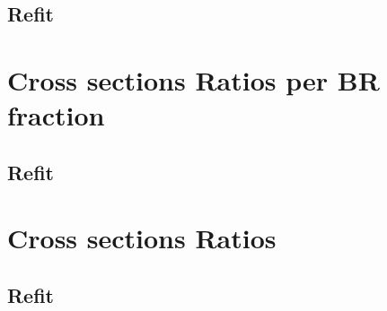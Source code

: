 \documentclass[a4paper,12pt]{article}
\begin{document}
\subsection*{Refit}


% 


\section*{Cross sections Ratios per BR fraction}

\subsection*{Refit}


% 


\section*{Cross sections Ratios}

\subsection*{Refit}


% 
\end{document}
